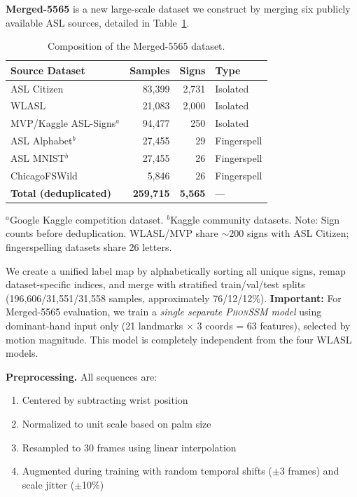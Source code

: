\documentclass{article}
\theoremstyle{definition}
\theoremstyle{remark}
\newcommand{\phonssm}{\textsc{PhonSSM}}
\begin{document}
\textbf{Merged-5565} is a new large-scale dataset we construct by merging six publicly available ASL sources, detailed in Table~\ref{tab:merged_sources}.

\begin{table}[ht]
\caption{Composition of the Merged-5565 dataset.}
\label{tab:merged_sources}
\vspace{-1mm}
\begin{center}
\begin{small}
\begin{tabular}{lrrl}
\toprule
Source Dataset & Samples & Signs & Type \\
\midrule
ASL Citizen \citep{desai2023asl} & 83,399 & 2,731 & Isolated \\
WLASL \citep{li2020word} & 21,083 & 2,000 & Isolated \\
MVP/Kaggle ASL-Signs$^a$ & 94,477 & 250 & Isolated \\
\addlinespace
ASL Alphabet$^b$ & 27,455 & 29 & Fingerspell \\
ASL MNIST$^b$ & 27,455 & 26 & Fingerspell \\
ChicagoFSWild \citep{shi2019fingerspelling} & 5,846 & 26 & Fingerspell \\
\midrule
\textbf{Total (deduplicated)} & \textbf{259,715} & \textbf{5,565} & --- \\
\bottomrule
\end{tabular}
\end{small}
\end{center}
\vspace{1mm}
{\footnotesize $^a$Google Kaggle competition dataset. $^b$Kaggle community datasets. Note: Sign counts before deduplication. WLASL/MVP share ${\sim}$200 signs with ASL Citizen; fingerspelling datasets share 26 letters.}
\vspace{-2mm}
\end{table}

We create a unified label map by alphabetically sorting all unique signs, remap dataset-specific indices, and merge with stratified train/val/test splits (196,606/31,551/31,558 samples, approximately 76/12/12\%). \textbf{Important:} For Merged-5565 evaluation, we train a \textit{single separate \phonssm{} model} using dominant-hand input only (21 landmarks $\times$ 3 coords = 63 features), selected by motion magnitude. This model is completely independent from the four WLASL models.

\textbf{Preprocessing.} All sequences are:
\begin{enumerate}[nosep,topsep=3pt,leftmargin=*]
\item Centered by subtracting wrist position
\item Normalized to unit scale based on palm size
\item Resampled to 30 frames using linear interpolation
\item Augmented during training with random temporal shifts ($\pm$3 frames) and scale jitter ($\pm$10\%)
\end{enumerate}
\end{document}
